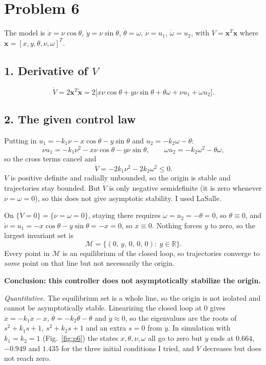 \section*{Problem 6}

The model is $\dot x=\nu\cos\theta$, $\dot y=\nu\sin\theta$, $\dot\theta=\omega$, $\dot\nu=u_1$, $\dot\omega=u_2$, with $V=\mathbf{x}^T\mathbf{x}$ where $\mathbf{x}=[x,y,\theta,\nu,\omega]^T$.

\subsection*{1. Derivative of $V$}

\[
\dot V=2\mathbf{x}^T\dot{\mathbf{x}}
=2\big[x\nu\cos\theta+y\nu\sin\theta+\theta\omega+\nu u_1+\omega u_2\big].
\]

\subsection*{2. The given control law}

Putting in $u_1=-k_1\nu-x\cos\theta-y\sin\theta$ and $u_2=-k_2\omega-\theta$:
\[
\nu u_1=-k_1\nu^2-x\nu\cos\theta-y\nu\sin\theta,\qquad \omega u_2=-k_2\omega^2-\theta\omega ,
\]
so the cross terms cancel and
\[
\dot V=-2k_1\nu^2-2k_2\omega^2\le0 .
\]
$V$ is positive definite and radially unbounded, so the origin is stable and trajectories stay bounded. But $\dot V$ is only negative semidefinite (it is zero whenever $\nu=\omega=0$), so this does not give asymptotic stability. I used LaSalle.

On $\{\dot V=0\}=\{\nu=\omega=0\}$, staying there requires $\dot\omega=u_2=-\theta=0$, so $\theta\equiv0$, and $\dot\nu=u_1=-x\cos\theta-y\sin\theta=-x=0$, so $x\equiv0$. Nothing forces $y$ to zero, so the largest invariant set is
\[
\mathcal M=\{(0,\,y,\,0,\,0,\,0):\ y\in\mathbb R\}.
\]
Every point in $\mathcal M$ is an equilibrium of the closed loop, so trajectories converge to \emph{some} point on that line but not necessarily the origin.

\textbf{Conclusion: this controller does not asymptotically stabilize the origin.}

\emph{Quantitative.} The equilibrium set is a whole line, so the origin is not isolated and cannot be asymptotically stable. Linearizing the closed loop at $0$ gives $\ddot x=-k_1\dot x-x$, $\ddot\theta=-k_2\dot\theta-\theta$ and $\dot y\approx0$, so the eigenvalues are the roots of $s^2+k_1s+1$, $s^2+k_2s+1$ and an extra $s=0$ from $y$. In simulation with $k_1=k_2=1$ (Fig.~\ref{fig:p6}) the states $x,\theta,\nu,\omega$ all go to zero but $y$ ends at $0.664$, $-0.949$ and $1.435$ for the three initial conditions I tried, and $V$ decreases but does not reach zero.

